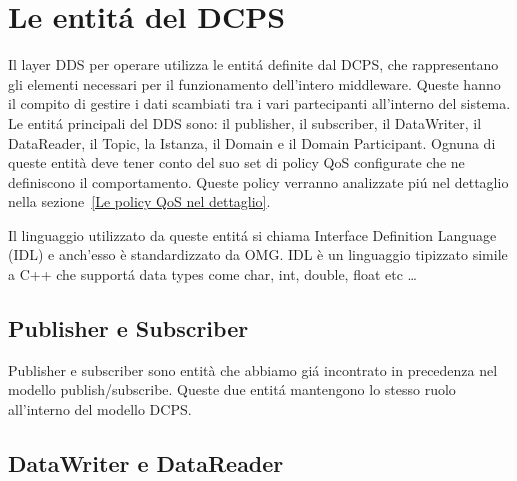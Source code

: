 

\section{Le entitá del DCPS}
Il layer DDS per operare utilizza le entitá definite dal DCPS, 
che rappresentano gli elementi necessari
per il funzionamento dell'intero middleware. Queste hanno il compito di 
gestire i dati
scambiati tra i vari partecipanti all'interno del sistema. 
Le entitá principali del DDS sono: 
il publisher, il subscriber, il DataWriter, il DataReader, il Topic,
la Istanza, il Domain e il Domain Participant.
Ognuna di queste entità deve tener conto del suo set di policy 
QoS configurate
che ne definiscono il comportamento. Queste policy verranno analizzate 
piú nel dettaglio nella sezione~\ref{Le policy QoS nel dettaglio}.

Il linguaggio utilizzato da queste entitá si chiama Interface 
Definition Language (IDL) e anch'esso è standardizzato da OMG. 
IDL è un linguaggio tipizzato 
simile a C++ che supportá data types come char, int, double, float etc
\cite{1494965} \dots


\subsection{Publisher e Subscriber}
Publisher e subscriber sono entità che abbiamo giá incontrato
in precedenza nel modello publish/subscribe. Queste due entitá 
mantengono lo stesso ruolo all'interno del modello DCPS.

\subsection{DataWriter e DataReader}

